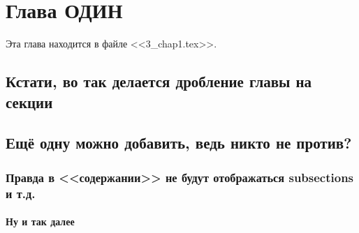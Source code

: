 \chapter{Глава ОДИН}
\label{ch:1}
    Эта глава находится в файле <<3\_chap1.tex>>.
    
    \section{Кстати, во так делается дробление главы на секции}

    \section{Ещё одну можно добавить, ведь никто не против?}
    \subsection{Правда в <<содержании>> не будут отображаться subsections и т.д.}
    \subsubsection{Ну и так далее}
    